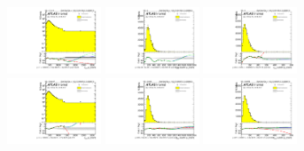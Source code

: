\begin{figure}[htbp!]
\begin{center}
\includegraphics[width=0.25\textwidth,angle=-90]{figures/boosted/Reweight/Fits/Moriond_NoTag_2Trk_split_lead_Incl_sublHCand_Pt_m_1.pdf}
\includegraphics[width=0.25\textwidth,angle=-90]{figures/boosted/Reweight/Fits/Moriond_NoTag_2Trk_split_lead_Incl_sublHCand_trk0_Pt.pdf}
\includegraphics[width=0.25\textwidth,angle=-90]{figures/boosted/Reweight/Fits/Moriond_NoTag_2Trk_split_lead_Incl_sublHCand_trk1_Pt.pdf} \\
\includegraphics[width=0.25\textwidth,angle=-90]{figures/boosted/Reweight/Fits/Moriond_bkg_0_NoTag_2Trk_split_lead_Incl_sublHCand_Pt_m_1.pdf}
\includegraphics[width=0.25\textwidth,angle=-90]{figures/boosted/Reweight/Fits/Moriond_bkg_0_NoTag_2Trk_split_lead_Incl_sublHCand_trk0_Pt.pdf}
\includegraphics[width=0.25\textwidth,angle=-90]{figures/boosted/Reweight/Fits/Moriond_bkg_0_NoTag_2Trk_split_lead_Incl_sublHCand_trk1_Pt.pdf} \\

\end{center}
\end{figure}
